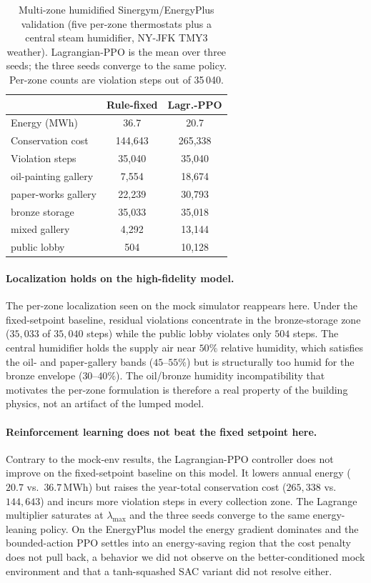 \documentclass[11pt,a4paper]{article}
\begin{document}
\begin{table}[t]
\centering
\caption{Multi-zone humidified Sinergym/EnergyPlus validation (five
per-zone thermostats plus a central steam humidifier, NY-JFK TMY3
weather). Lagrangian-PPO is the mean over three seeds; the three seeds
converge to the same policy. Per-zone counts are violation steps out of
35\,040.}
\label{tab:sinergym}
\small
\setlength{\tabcolsep}{4pt}
\begin{tabular}{lcc}
\toprule
& Rule-fixed & Lagr.-PPO \\
\midrule
Energy (MWh)            & 36.7    & 20.7 \\
Conservation cost       & 144{,}643 & 265{,}338 \\
Violation steps         & 35{,}040  & 35{,}040 \\
\midrule
oil-painting gallery    & 7{,}554   & 18{,}674 \\
paper-works gallery     & 22{,}239  & 30{,}793 \\
bronze storage          & 35{,}033  & 35{,}018 \\
mixed gallery           & 4{,}292   & 13{,}144 \\
public lobby            & 504       & 10{,}128 \\
\bottomrule
\end{tabular}
\end{table}

\paragraph{Localization holds on the high-fidelity model.}
The per-zone localization seen on the mock simulator reappears here.
Under the fixed-setpoint baseline, residual violations concentrate in
the bronze-storage zone ($35{,}033$ of $35{,}040$ steps) while the
public lobby violates only $504$ steps. The central humidifier holds
the supply air near $50\%$ relative humidity, which satisfies the oil-
and paper-gallery bands ($45$--$55\%$) but is structurally too humid
for the bronze envelope ($30$--$40\%$). The oil/bronze humidity
incompatibility that motivates the per-zone formulation is therefore a
real property of the building physics, not an artifact of the lumped
model.

\paragraph{Reinforcement learning does not beat the fixed setpoint here.}
Contrary to the mock-env results, the Lagrangian-PPO controller does
not improve on the fixed-setpoint baseline on this model. It lowers
annual energy ($20.7$ vs.\ $36.7$\,MWh) but raises the year-total
conservation cost ($265{,}338$ vs.\ $144{,}643$) and incurs more
violation steps in every collection zone. The Lagrange multiplier
saturates at $\lambda_{\max}$ and the three seeds converge to the same
energy-leaning policy. On the EnergyPlus model the energy gradient
dominates and the bounded-action PPO settles into an energy-saving
region that the cost penalty does not pull back, a behavior we did not
observe on the better-conditioned mock environment and that a
tanh-squashed SAC variant did not resolve either.
\end{document}
